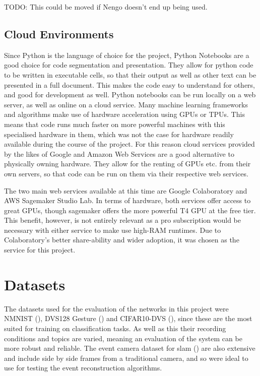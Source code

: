 \color{red} TODO: This could be moved if Nengo doesn't end up being used. \color{black}

\subsection{Cloud Environments}

Since Python is the language of choice for the project, Python Notebooks are a good choice for code segmentation and presentation. They allow for python code to be written in executable cells, so that their output as well as other text can be presented in a full document. This makes the code easy to understand for others, and good for development as well. Python notebooks can be run locally on a web server, as well as online on a cloud service. Many machine learning frameworks and algorithms make use of hardware acceleration using GPUs or TPUs. This means that code runs much faster on more powerful machines with this specialised hardware in them, which was not the case for hardware readily available during the course of the project. For this reason cloud services provided by the likes of Google and Amazon Web Services are a good alternative to physically owning hardware. They allow for the renting of GPUs etc. from their own servers, so that code can be run on them via their respective web services. 

The two main web services available at this time are Google Colaboratory\cite{GoogleColab} and AWS Sagemaker Studio Lab\cite{AwsSagemaker}. In terms of hardware, both services offer access to great GPUs, though sagemaker offers the more powerful T4 GPU at the free tier. This benefit, however, is not entirely relevant as a pro subscription would be necessary with either service to make use high-RAM runtimes. Due to Colaboratory's better share-ability and wider adoption, it was chosen as the service for this project.

\section{Datasets}

The datasets used for the evaluation of the networks in this project were NMNIST (), DVS128 Gesture () and CIFAR10-DVS (), since these are the most suited for training on classification tasks. As well as this their recording conditions and topics are varied, meaning an evaluation of the system can be more robust and reliable. The event camera dataset for slam () are also extensive and include side by side frames from a traditional camera, and so were ideal to use for testing the event reconstruction algorithms.

